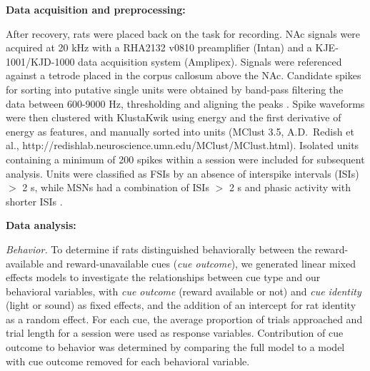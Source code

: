 \documentclass[11pt]{article}
\let\cite=\citep
\providecommand{\DIFadd}[1]{{\protect\color{red} \sf #1}} %
\providecommand{\DIFdel}[1]{} %
\providecommand{\DIFaddbegin}{} %
\providecommand{\DIFaddend}{} %
\providecommand{\DIFdelbegin}{} %
\providecommand{\DIFdelend}{} %
\newcommand{\DIFscaledelfig}{0.5}
\newlength{\DIFdelgraphicswidth} %
\newlength{\DIFdelgraphicsheight} %
\newcommand{\DIFaddincludegraphics}[2][]{{\color{red}\fbox{\DIFOincludegraphics[#1]{#2}}}} %
\newcommand{\DIFdelincludegraphics}[2][]{%
\sbox{\DIFdelgraphicsbox}{\DIFOincludegraphics[#1]{#2}}%
\settoboxwidth{\DIFdelgraphicswidth}{\DIFdelgraphicsbox} %
\settoboxtotalheight{\DIFdelgraphicsheight}{\DIFdelgraphicsbox} %
\scalebox{\DIFscaledelfig}{%
\parbox[b]{\DIFdelgraphicswidth}{\usebox{\DIFdelgraphicsbox}\\[-\baselineskip] \rule{\DIFdelgraphicswidth}{0em}}\llap{\resizebox{\DIFdelgraphicswidth}{\DIFdelgraphicsheight}{%
\setlength{\unitlength}{\DIFdelgraphicswidth}%
\begin{picture}(1,1)%
\thicklines\linethickness{2pt} %
{\color[rgb]{1,0,0}\put(0,0){\framebox(1,1){}}}%
{\color[rgb]{1,0,0}\put(0,0){\line( 1,1){1}}}%
{\color[rgb]{1,0,0}\put(0,1){\line(1,-1){1}}}%
\end{picture}%
}\hspace*{3pt}}} %
} %
\DeclareRobustCommand{\DIFaddbegin}{\DIFOaddbegin \let\includegraphics\DIFaddincludegraphics} %
\DeclareRobustCommand{\DIFaddend}{\DIFOaddend \let\includegraphics\DIFOincludegraphics} %
\DeclareRobustCommand{\DIFdelbegin}{\DIFOdelbegin \let\includegraphics\DIFdelincludegraphics} %
\DeclareRobustCommand{\DIFdelend}{\DIFOaddend \let\includegraphics\DIFOincludegraphics} %
\begin{document}
{\bf Data acquisition and preprocessing:}

After recovery, rats were placed back on the task for recording. NAc
signals were acquired at 20 kHz with a RHA2132 v0810 preamplifier
(Intan) and a KJE-1001/KJD-1000 data acquisition system
(Amplipex). Signals were referenced against a tetrode placed in the
corpus callosum above the NAc. Candidate spikes for sorting into
putative single units were obtained by band-pass filtering the data
between 600-9000 Hz, thresholding and aligning the peaks \cite[UltraMegaSort2k, ][]{Hill2011}. Spike waveforms were then
clustered with KlustaKwik using energy and the first derivative of
energy as features, and manually sorted into units (MClust 3.5,
A.D.\ Redish et al., http://redishlab.neuroscience.umn.edu/MClust/MClust.html). Isolated units containing a minimum of 200
spikes within a session were included for subsequent analysis. Units
were classified as \DIFdelbegin \DIFdel{fast spiking interneurons (FSIs ) }\DIFdelend \DIFaddbegin \DIFadd{FSIs }\DIFaddend by an absence of
interspike intervals (ISIs) $>$ 2 s, while \DIFdelbegin \DIFdel{medium spiny neurons (MSNs
)
}\DIFdelend \DIFaddbegin \DIFadd{MSNs
}\DIFaddend had a combination of ISIs $>$ 2 s and phasic activity with shorter
ISIs \cite{Barnes2005,Atallah2014}.

{\bf Data analysis:}

{\it Behavior.} To determine if rats distinguished behaviorally
between the reward-available and reward-unavailable cues ({\it cue
outcome}), we generated linear mixed effects models to investigate
the relationships between cue type and our behavioral variables, with
{\it cue outcome} (reward available or not) and {\it cue identity}
(light or sound) as fixed effects, and the addition of an intercept
for rat identity as a random effect. For each cue, the average
proportion of trials approached and trial length for a session were
used as response variables. Contribution of cue outcome to behavior
was determined by comparing the full model to a model with cue outcome
removed for each behavioral variable.
\end{document}
